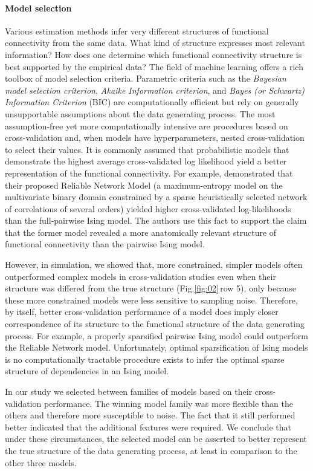 \documentclass[10pt]{article}
\newcommand{\figref}[2]{Fig.\;\ref{fig:#1}\,#2}
\begin{document}
\paragraph{Model selection}
Various estimation methods infer very different structures of functional connectivity from the same data. What kind of structure expresses most relevant information? How does one determine which functional connectivity structure is best supported by the empirical data? The field of machine learning offers a rich toolbox of model selection criteria. Parametric criteria such as the \emph{Bayesian model selection criterion}, \emph{Akaike Information criterion}, and \emph{Bayes (or Schwartz) Information Criterion} (BIC) are computationally efficient but rely on generally unsupportable assumptions about the data generating process.  The most assumption-free yet more computationally intensive are procedures based on cross-validation \cite{Arlot:2010} and, when models have hyperparameters, nested cross-validation to select their values. It is commonly assumed that probabilistic models that demonstrate the highest average cross-validated log likelihood yield a better representation of the functional connectivity. For example, \cite{Ganmor:2011} demonstrated that their proposed Reliable Network Model (a maximum-entropy model on the multivariate binary domain constrained by a sparse heuristically selected network of correlations of several orders) yielded higher cross-validated log-likelihoods than the full-pairwise Ising model. The authors use this fact to support the claim that the former model revealed a more anatomically relevant structure of functional connectivity than the pairwise Ising model.

However, in simulation, we showed that, more constrained, simpler models often outperformed complex models in cross-validation studies even when their structure was differed from the true structure (\figref{02}{row 5}), only because these more constrained models were less sensitive to sampling noise. Therefore, by itself, better cross-validation performance of a model does imply closer correspondence of its structure to the functional structure of the data generating process. For example, a properly sparsified pairwise Ising model could outperform the Reliable Network model.  Unfortunately, optimal sparsification of Ising models is no computationally tractable procedure exists to infer the optimal sparse structure of dependencies in an Ising model.

In our study we selected between families of models based on their cross-validation performance. The winning model family was more flexible than the others and therefore more susceptible to noise. The fact that it still performed better indicated that the additional features were required. We conclude that under these circumstances, the selected model can be asserted to better represent the true structure of the data generating process, at least in comparison to the other three models.
\end{document}
